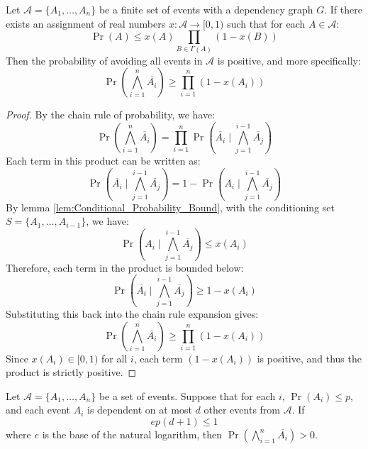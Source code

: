 \begin{theorem}
    \label{thm:Asymmetric_Lovasz_Local_Lemma}
    Let $\mathcal{A} = \{A_1, \ldots, A_n\}$ be a finite set of events with a dependency graph $G$. If there exists an assignment of real numbers $x: \mathcal{A} \to [0,1)$ such that for each $A \in \mathcal{A}$:
    $$ \Pr(A) \leq x(A) \prod_{B \in \Gamma(A)} (1-x(B)) $$
    Then the probability of avoiding all events in $\mathcal{A}$ is positive, and more specifically:
    $$ \Pr\left(\bigwedge_{i=1}^n \overline{A_i}\right) \geq \prod_{i=1}^n (1-x(A_i)) $$
\end{theorem}

\begin{proof}
    By the chain rule of probability, we have:
    $$ \Pr\left(\bigwedge_{i=1}^n \overline{A_i}\right) = \prod_{i=1}^n \Pr\left(\overline{A_i} \mid \bigwedge_{j=1}^{i-1} \overline{A_j}\right) $$
    Each term in this product can be written as:
    $$ \Pr\left(\overline{A_i} \mid \bigwedge_{j=1}^{i-1} \overline{A_j}\right) = 1 - \Pr\left(A_i \mid \bigwedge_{j=1}^{i-1} \overline{A_j}\right) $$
    By lemma \ref{lem:Conditional_Probability_Bound}, with the conditioning set $S = \{A_1, \dots, A_{i-1}\}$, we have:
    $$ \Pr\left(A_i \mid \bigwedge_{j=1}^{i-1} \overline{A_j}\right) \leq x(A_i) $$
    Therefore, each term in the product is bounded below:
    $$ \Pr\left(\overline{A_i} \mid \bigwedge_{j=1}^{i-1} \overline{A_j}\right) \geq 1 - x(A_i) $$
    Substituting this back into the chain rule expansion gives:
    $$ \Pr\left(\bigwedge_{i=1}^n \overline{A_i}\right) \geq \prod_{i=1}^n (1 - x(A_i)) $$
    Since $x(A_i) \in [0,1)$ for all $i$, each term $(1-x(A_i))$ is positive, and thus the product is strictly positive.
\end{proof}

\begin{theorem}
    \label{thm:Symmetric_Lovasz_Local_Lemma}
    Let $\mathcal{A} = \{A_1, \ldots, A_n\}$ be a set of events. Suppose that for each $i$, $\Pr(A_i) \leq p$, and each event $A_i$ is dependent on at most $d$ other events from $\mathcal{A}$. If
    $$ ep(d+1) \leq 1 $$
    where $e$ is the base of the natural logarithm, then $\Pr(\bigwedge_{i=1}^n \overline{A_i}) > 0$.
\end{theorem}

